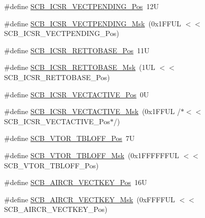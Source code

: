 \begin{DoxyCompactItemize}
\item 
\#define \mbox{\hyperlink{group___c_m_s_i_s___s_c_b_gada60c92bf88d6fd21a8f49efa4a127b8}{S\+C\+B\+\_\+\+I\+C\+S\+R\+\_\+\+V\+E\+C\+T\+P\+E\+N\+D\+I\+N\+G\+\_\+\+Pos}}~12U
\item 
\#define \mbox{\hyperlink{group___c_m_s_i_s___s_c_b_gacb6992e7c7ddc27a370f62878a21ef72}{S\+C\+B\+\_\+\+I\+C\+S\+R\+\_\+\+V\+E\+C\+T\+P\+E\+N\+D\+I\+N\+G\+\_\+\+Msk}}~(0x1\+F\+F\+U\+L $<$$<$ S\+C\+B\+\_\+\+I\+C\+S\+R\+\_\+\+V\+E\+C\+T\+P\+E\+N\+D\+I\+N\+G\+\_\+\+Pos)
\item 
\#define \mbox{\hyperlink{group___c_m_s_i_s___s_c_b_ga403d154200242629e6d2764bfc12a7ec}{S\+C\+B\+\_\+\+I\+C\+S\+R\+\_\+\+R\+E\+T\+T\+O\+B\+A\+S\+E\+\_\+\+Pos}}~11U
\item 
\#define \mbox{\hyperlink{group___c_m_s_i_s___s_c_b_gaca6fc3f79bb550f64fd7df782ed4a5f6}{S\+C\+B\+\_\+\+I\+C\+S\+R\+\_\+\+R\+E\+T\+T\+O\+B\+A\+S\+E\+\_\+\+Msk}}~(1\+U\+L $<$$<$ S\+C\+B\+\_\+\+I\+C\+S\+R\+\_\+\+R\+E\+T\+T\+O\+B\+A\+S\+E\+\_\+\+Pos)
\item 
\#define \mbox{\hyperlink{group___c_m_s_i_s___s_c_b_gae4f602c7c5c895d5fb687b71b0979fc3}{S\+C\+B\+\_\+\+I\+C\+S\+R\+\_\+\+V\+E\+C\+T\+A\+C\+T\+I\+V\+E\+\_\+\+Pos}}~0U
\item 
\#define \mbox{\hyperlink{group___c_m_s_i_s___s_c_b_ga5533791a4ecf1b9301c883047b3e8396}{S\+C\+B\+\_\+\+I\+C\+S\+R\+\_\+\+V\+E\+C\+T\+A\+C\+T\+I\+V\+E\+\_\+\+Msk}}~(0x1\+F\+F\+U\+L /$\ast$$<$$<$ S\+C\+B\+\_\+\+I\+C\+S\+R\+\_\+\+V\+E\+C\+T\+A\+C\+T\+I\+V\+E\+\_\+\+Pos$\ast$/)
\item 
\#define \mbox{\hyperlink{group___c_m_s_i_s___s_c_b_gac6a55451ddd38bffcff5a211d29cea78}{S\+C\+B\+\_\+\+V\+T\+O\+R\+\_\+\+T\+B\+L\+O\+F\+F\+\_\+\+Pos}}~7U
\item 
\#define \mbox{\hyperlink{group___c_m_s_i_s___s_c_b_ga75e395ed74042923e8c93edf50f0996c}{S\+C\+B\+\_\+\+V\+T\+O\+R\+\_\+\+T\+B\+L\+O\+F\+F\+\_\+\+Msk}}~(0x1\+F\+F\+F\+F\+F\+F\+U\+L $<$$<$ S\+C\+B\+\_\+\+V\+T\+O\+R\+\_\+\+T\+B\+L\+O\+F\+F\+\_\+\+Pos)
\item 
\#define \mbox{\hyperlink{group___c_m_s_i_s___s_c_b_gaaa27c0ba600bf82c3da08c748845b640}{S\+C\+B\+\_\+\+A\+I\+R\+C\+R\+\_\+\+V\+E\+C\+T\+K\+E\+Y\+\_\+\+Pos}}~16U
\item 
\#define \mbox{\hyperlink{group___c_m_s_i_s___s_c_b_ga90c7cf0c490e7ae55f9503a7fda1dd22}{S\+C\+B\+\_\+\+A\+I\+R\+C\+R\+\_\+\+V\+E\+C\+T\+K\+E\+Y\+\_\+\+Msk}}~(0x\+F\+F\+F\+F\+U\+L $<$$<$ S\+C\+B\+\_\+\+A\+I\+R\+C\+R\+\_\+\+V\+E\+C\+T\+K\+E\+Y\+\_\+\+Pos)
\item 

\end{DoxyCompactItemize}

